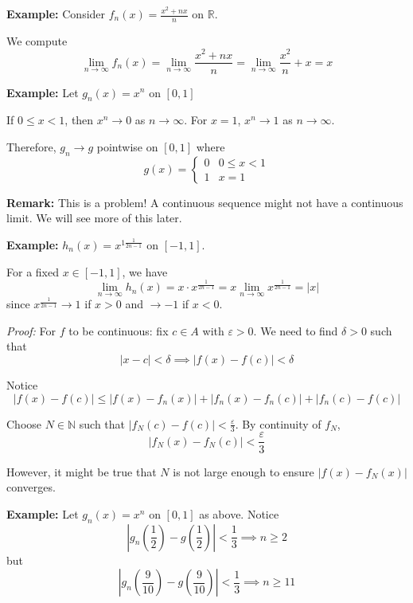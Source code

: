 \documentclass[12pt]{report}
\newcommand{\R}{\mathbb{R}}
\newcommand{\N}{\mathbb{N}}
\newcommand{\abs}[1]{\left\vert #1 \right\vert}
\newcommand{\ep}{\varepsilon}
\newenvironment*{tbox}[2][gray]{
    \begin{tcolorbox}[
        parbox=false,
        colback=#1!5!white,
        colframe=#1!75!black,
        breakable,
        title={#2}
    ]}
    {\end{tcolorbox}}
\begin{document}
        \textbf{Example:} Consider $f_n(x) = \frac{x^2 + nx}{n}$ on $\R$. 

        We compute 
        \[\lim_{n \to \infty} f_n(x) = \lim_{n \to \infty} \frac{x^2 + nx}{n} = \lim_{n \to \infty} \frac{x^2}{n} + x = x\] 

        \textbf{Example:} Let $g_n(x) = x^n$ on $[0, 1]$ 

        If $0 \leq x < 1$, then $x^n \to 0$ as $n \to \infty$. For $x = 1$, $x^n \to 1$ as $n \to \infty$. 

        Therefore, $g_n \to g$ pointwise on $[0, 1]$ where 
        \[g(x) = \begin{cases}
            0 & 0 \leq x < 1\\ 
            1 & x = 1
        \end{cases}\]

        \textbf{Remark:} This is a problem! A continuous sequence might not have a continuous limit. We will see more of this later. 

        \textbf{Example:} $h_n(x) = x^{1  \frac{1}{2n - 1}}$ on $[-1, 1]$. 

        For a fixed $x \in [-1, 1]$, we have 
        \[\lim_{n \to \infty} h_n(x) = x\cdot x^{\frac{1}{2n-1}} = x \lim_{n\to \infty} x^{\frac{1}{2n - 1}} = \abs{x}\]
        since $x^{\frac{1}{2n-1}} \to 1$ if $x > 0$ and $\to -1$ if $x < 0$. 

        \begin{tbox}{\textbf{Lemma (Failure Continuity of the Limit Function):}}
            \emph{Proof:} For $f$ to be continuous: fix $c \in A$ with $\ep > 0$. We need to find $\delta > 0$ such that 
            \[\abs{x - c} < \delta \implies \abs{f(x) - f(c)} < \delta\]

            Notice 
            \[\abs{f(x) - f(c)} \leq \abs{f(x) - f_n(x)} + \abs{f_n(x) - f_n(c)} + \abs{f_n(c) - f(c)}\]

            Choose $N \in \N$ such that $\abs{f_N(c) - f(c)} < \frac{\ep}{3}$. By continuity of $f_N$, 
            \[\abs{f_N(x) - f_N(c)} < \frac{\ep}{3}\]

            However, it might be true that $N$ is not large enough to ensure $\abs{f(x) - f_N(x)}$ converges. 
        \end{tbox}

        \textbf{Example:} Let $g_n(x) = x^n$ on $[0, 1]$ as above. Notice 
        \[\abs{g_n(\frac{1}{2}) - g(\frac{1}{2})} < \frac{1}{3} \implies n \geq 2\]
        but 
        \[\abs{g_n(\frac{9}{10}) - g(\frac{9}{10})}< \frac{1}{3} \implies n \geq 11\]
\end{document}

